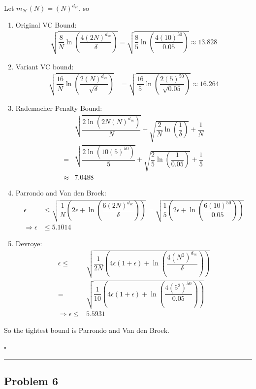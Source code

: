 \documentclass[12pt]{article}
\newcommand*{\QEDB}{\hfill\ensuremath{\square}}
\newcommand{\ParTh}[1]{\left(#1\right)}
\newcommand{\horrule}[1]{\rule{\linewidth}{#1}}
\begin{document}
Let $m_{\mathcal{H}}\ParTh{N}=\ParTh{N}^{d_{\text{vc}}}$, so
\begin{enumerate}
\item Original VC Bound:
\begin{align}
\sqrt{\dfrac{8}{N}\ln\ParTh{\dfrac{4\ParTh{2N}^{d_{\text{vc}}}}{\delta}}}=\sqrt{\dfrac{8}{5}\ln\ParTh{\dfrac{4\ParTh{10}^{50}}{0.05}}}\approx13.828
\end{align}
\item Variant VC bound:
\begin{align}
	\sqrt{\dfrac{16}{N}\ln\ParTh{\dfrac{2\ParTh{N}^{d_{\text{vc}}}}{\sqrt{\delta}}}}&=\sqrt{\dfrac{16}{5}\ln\ParTh{\dfrac{2\ParTh{5}^{50}}{\sqrt{0.05}}}}\approx16.264
\end{align}
\item Rademacher Penalty Bound:
\begin{align}
&\sqrt{\dfrac{2\ln\ParTh{{2N\ParTh{N}^{d_{\text{vc}}}}}}{N}}+\sqrt{\dfrac{2}{N}\ln\ParTh{\dfrac{1}{\delta}}}+\dfrac{1}{N}\\=&\sqrt{\dfrac{2\ln\ParTh{10\ParTh{5}^{50}}}{5}}+\sqrt{\dfrac{2}{5}\ln\ParTh{\dfrac{1}{0.05}}}+\dfrac{1}{5}\\\approx&7.0488
\end{align}
\item Parrondo and Van den Broek:
\begin{align}
\epsilon&\leq\sqrt{\dfrac{1}{N}\ParTh{2\epsilon+\ln\ParTh{\dfrac{6\ParTh{2N}^{d_{\text{vc}}}}{\delta}}}}=\sqrt{\dfrac{1}{5}\ParTh{2\epsilon+\ln\ParTh{\dfrac{6\ParTh{10}^{50}}{0.05}}}}\\
\Rightarrow\epsilon&\leq5.1014
\end{align}
\item Devroye:
\begin{align}
\epsilon\leq&\sqrt{\dfrac{1}{2N}\ParTh{4\epsilon\ParTh{1+\epsilon}+\ln\ParTh{\dfrac{4\ParTh{N^2}^{d_{\text{vc}}}}{\delta}}}}\\=&\sqrt{\dfrac{1}{10}\ParTh{4\epsilon\ParTh{1+\epsilon}+\ln\ParTh{\dfrac{4\ParTh{{5}^2}^{50}}{0.05}}}}\\
\Rightarrow\epsilon\leq&5.5931
\end{align}
\end{enumerate}
So the tightest bound is Parrondo and Van den Broek.

\QEDB

\horrule{0.5pt}

\subsection*{Problem 6}
\end{document}
